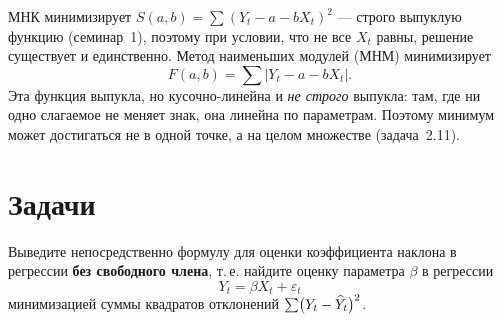 МНК минимизирует $S(a,b) = \sum(Y_t - a - bX_t)^2$ — строго выпуклую функцию
(семинар~1), поэтому при условии, что не все $X_t$ равны, решение существует и
единственно. Метод наименьших модулей (МНМ) минимизирует
\begin{equation}
  F(a,b) = \sum\bigl|Y_t - a - bX_t\bigr| .
  \label{eq:lad}
\end{equation}
Эта функция выпукла, но кусочно-линейна и \emph{не строго} выпукла: там, где ни
одно слагаемое не меняет знак, она линейна по параметрам. Поэтому минимум может
достигаться не в одной точке, а на целом множестве (задача~2.11).
\fi

\section{Задачи}


Выведите непосредственно формулу для оценки коэффициента наклона в регрессии
\textbf{без свободного члена}, т.\,е. найдите оценку параметра $\beta$ в регрессии
\[
  Y_t = \beta X_t + \varepsilon_t
\]
минимизацией суммы квадратов отклонений $\sum \bigl(Y_t - \widehat{Y}_t\bigr)^2$.

